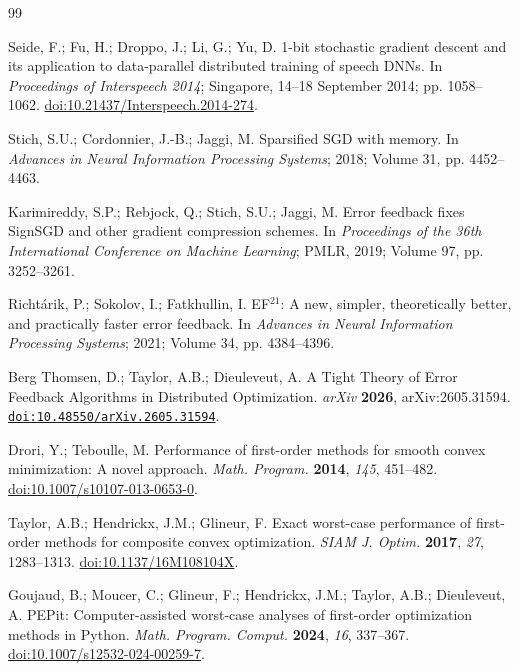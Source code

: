 \documentclass[mathematics,article,submit,moreauthors]{Definitions/mdpi}
\begin{document}


\begin{thebibliography}{99}

Seide, F.; Fu, H.; Droppo, J.; Li, G.; Yu, D.
1-bit stochastic gradient descent and its application to data-parallel distributed training of speech DNNs.
In \emph{Proceedings of Interspeech 2014};
Singapore, 14--18 September 2014;
pp. 1058--1062.
\href{https://doi.org/10.21437/Interspeech.2014-274}
{doi:10.21437/Interspeech.2014-274}.

Stich, S.U.; Cordonnier, J.-B.; Jaggi, M.
Sparsified SGD with memory.
In \emph{Advances in Neural Information Processing Systems};
2018; Volume 31, pp. 4452--4463.

Karimireddy, S.P.; Rebjock, Q.; Stich, S.U.; Jaggi, M.
Error feedback fixes SignSGD and other gradient compression schemes.
In \emph{Proceedings of the 36th International Conference on Machine Learning};
PMLR, 2019; Volume 97, pp. 3252--3261.

Richt\'arik, P.; Sokolov, I.; Fatkhullin, I.
EF$^{21}$: A new, simpler, theoretically better, and practically faster error feedback.
In \emph{Advances in Neural Information Processing Systems};
2021; Volume 34, pp. 4384--4396.

Berg Thomsen, D.; Taylor, A.B.; Dieuleveut, A.
A Tight Theory of Error Feedback Algorithms in Distributed Optimization.
\emph{arXiv} \textbf{2026}, arXiv:2605.31594.
\href{https://doi.org/10.48550/arXiv.2605.31594}
{\nolinkurl{doi:10.48550/arXiv.2605.31594}}.

Drori, Y.; Teboulle, M.
Performance of first-order methods for smooth convex minimization: A novel approach.
\emph{Math. Program.} \textbf{2014}, \emph{145}, 451--482.
\href{https://doi.org/10.1007/s10107-013-0653-0}
{doi:10.1007/s10107-013-0653-0}.

Taylor, A.B.; Hendrickx, J.M.; Glineur, F.
Exact worst-case performance of first-order methods for composite convex optimization.
\emph{SIAM J. Optim.} \textbf{2017}, \emph{27}, 1283--1313.
\href{https://doi.org/10.1137/16M108104X}
{doi:10.1137/16M108104X}.

Goujaud, B.; Moucer, C.; Glineur, F.; Hendrickx, J.M.; Taylor, A.B.; Dieuleveut, A.
PEPit: Computer-assisted worst-case analyses of first-order optimization methods in Python.
\emph{Math. Program. Comput.} \textbf{2024}, \emph{16}, 337--367.
\href{https://doi.org/10.1007/s12532-024-00259-7}
{doi:10.1007/s12532-024-00259-7}.



\end{thebibliography}
\end{document}
